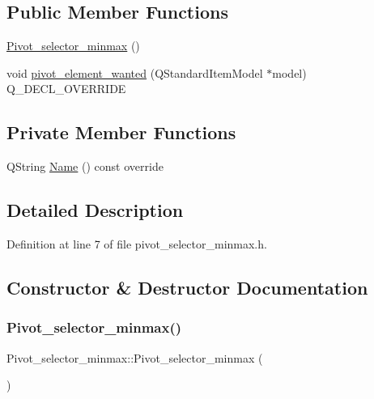 \subsection*{Public Member Functions}
\begin{DoxyCompactItemize}
\item 
\hyperlink{classPivot__selector__minmax_a34445fc22cde76deaa35ccc7a6b0b487}{Pivot\+\_\+selector\+\_\+minmax} ()
\item 
void \hyperlink{classPivot__selector__minmax_ae47a96737d527fa40d1ee6608caf9bf3}{pivot\+\_\+element\+\_\+wanted} (Q\+Standard\+Item\+Model $\ast$model) Q\+\_\+\+D\+E\+C\+L\+\_\+\+O\+V\+E\+R\+R\+I\+DE
\end{DoxyCompactItemize}
\subsection*{Private Member Functions}
\begin{DoxyCompactItemize}
\item 
Q\+String \hyperlink{classPivot__selector__minmax_a9df8c5a5f3a0cf1f9c97ee8d8ad68b1b}{Name} () const override
\end{DoxyCompactItemize}


\subsection{Detailed Description}


Definition at line 7 of file pivot\+\_\+selector\+\_\+minmax.\+h.



\subsection{Constructor \& Destructor Documentation}
\mbox{\label{classPivot__selector__minmax_a34445fc22cde76deaa35ccc7a6b0b487}} 
\subsubsection{\texorpdfstring{Pivot\+\_\+selector\+\_\+minmax()}{Pivot\_selector\_minmax()}}
{\footnotesize\ttfamily Pivot\+\_\+selector\+\_\+minmax\+::\+Pivot\+\_\+selector\+\_\+minmax (\begin{DoxyParamCaption}{ }\end{DoxyParamCaption})\hspace{0.3cm}{\ttfamily [default]}}



